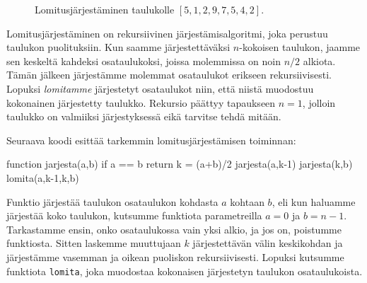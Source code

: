 \begin{figure}
\caption{Lomitusjärjestäminen taulukolle $[5,1,2,9,7,5,4,2]$.}
\label{fig:lomjar}
\end{figure}

Lomitusjärjestäminen on rekursiivinen järjestämisalgoritmi,
joka perustuu taulukon puolituksiin.
Kun saamme järjestettäväksi $n$-kokoisen taulukon,
jaamme sen keskeltä kahdeksi osataulukoksi,
joissa molemmissa on noin $n/2$ alkiota.
Tämän jälkeen järjestämme molemmat osataulukot erikseen rekursiivisesti.
Lopuksi \emph{lomitamme} järjestetyt osataulukot niin,
että niistä muodostuu kokonainen järjestetty taulukko.
Rekursio päättyy tapaukseen $n=1$, jolloin
taulukko on valmiiksi järjestyksessä eikä
tarvitse tehdä mitään.

Seuraava koodi esittää tarkemmin lomitusjärjestämisen toiminnan:

\begin{code}
function jarjesta(a,b)
    if a == b
        return
    k = (a+b)/2
    jarjesta(a,k-1)
    jarjesta(k,b)
    lomita(a,k-1,k,b)
\end{code}

Funktio järjestää taulukon osataulukon kohdasta
$a$ kohtaan $b$, eli kun haluamme järjestää koko taulukon,
kutsumme funktiota parametreilla $a=0$ ja $b=n-1$.
Tarkastamme ensin, onko osataulukossa vain yksi alkio,
ja jos on, poistumme funktiosta.
Sitten laskemme muuttujaan $k$ järjestettävän välin keskikohdan
ja järjestämme vasemman ja oikean puoliskon rekursiivisesti.
Lopuksi kutsumme funktiota \texttt{lomita},
joka muodostaa kokonaisen järjestetyn taulukon osataulukoista.

